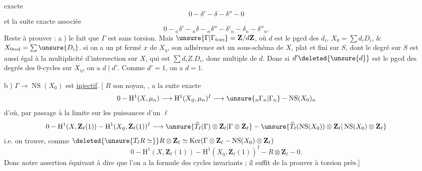 exacte
\[
0\mathbin{-}\delta'\mathbin{-}\delta\mathbin{-}\delta''\mathbin{-}0
\]
et la suite exacte associée
\[
0\mathbin{-}{}_n\delta'\mathbin{-}{}_n\delta\mathbin{-}{}_n\delta''\mathbin{-}\delta'_n\mathbin{-}\delta_n\mathbin{-}\delta''_n.
\]
Reste à prouver : \textcircled{a}) le fait que $\Gamma$ est sans torsion. Mais $\unsure{\Gamma|\Gamma_{\mathrm{tors}}}=\mathbf Z/d\mathbf Z$, où $d$ est le pgcd des $d_i$, $X_0=\sum d_iD_i$, \& $X_{0\mathrm{red}}=\sum\unsure{D_i}$.  si on a un pt fermé $x$ de $X_\eta$, son adhérence  est un sous-schéma   de $X$, plat et fini sur $S$,  dont le degré sur $S$ est aussi égal à la multiplicité d'intersection  sur $X$, qui est $\sum d_iZ.D_i$, donc multiple de $d$. Donc si $d'\deleted{\unsure{d}}$ est le pgcd des degrés des 0-cycles sur $X_\eta$, on a $d\mid d'$. Comme $d'=1$, on a $d=1$.

\textcircled{b}) $\Gamma\longrightarrow\operatorname{NS}(X_0)$ est \uline{injectif}.
[ $R$ son noyau, ,  a la suite exacte
\[
0\mathbin{-}\mathrm H^1(X,\mu_n)\longrightarrow\mathrm H^1(X_{\bar\eta},\mu_n)^I\longrightarrow\unsure{{}_n\Gamma_n|\Gamma_n}\mathbin{-}\operatorname{NS}(X_0)_n
\]
d'où, par passage à la limite sur les puissances d'un $\ell$
\[
0\mathbin{-}\mathrm H^1(X,\mathbf Z_\ell(1))\mathbin{-}\mathrm H^1(X_{\bar\eta},\mathbf Z_\ell(1))^I\longrightarrow\unsure{\widehat{T}_\ell(\Gamma)\otimes\mathbf Z_\ell|\Gamma\otimes\mathbf Z_\ell}\mathbin{-}\unsure{\widehat{T}_\ell(\operatorname{NS}(X_0))\otimes\mathbf Z_\ell|\operatorname{NS}(X_0)\otimes\mathbf Z_\ell}
\]
i.e. on trouve, comme $\deleted{\unsure{T_\ell R\simeq}}R\otimes\mathbf Z_\ell\simeq\operatorname{Ker}(\Gamma\otimes\mathbf Z_\ell\mathbin{-}\operatorname{NS}(X_0)\otimes\mathbf Z_\ell)$
\quad\unsure{$\rho$}
\[
0\mathbin{-}\mathrm H^1(X,\mathbf Z_\ell(1))\mathbin{-}\mathrm H^1(X_{\bar\eta},\mathbf Z_\ell(1))^I\mathbin{-}R\otimes\mathbf Z_\ell\mathbin{-}0.
\]
Donc notre assertion équivaut à dire que l'on a la formule des cycles invariants ;  il suffit de la prouver à torsion près.]

